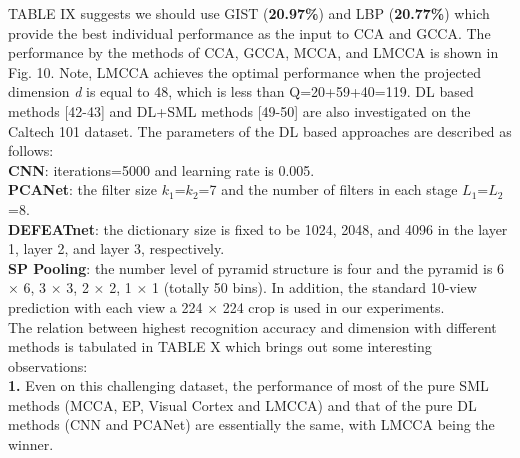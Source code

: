 \documentclass[journal]{IEEEtran}
\begin{document}
TABLE IX suggests we should use GIST (\textbf{20.97\%}) and LBP (\textbf{20.77\%}) which provide the best individual performance as the input to CCA and GCCA. %
The performance by the methods of CCA, GCCA, MCCA, and LMCCA is shown in Fig. 10. Note, LMCCA achieves the optimal performance when the projected dimension \emph{d} is equal to 48, which is less than Q=20+59+40=119. DL based methods [42-43] and DL+SML methods [49-50] are also investigated on the Caltech 101 dataset. The parameters of the DL based approaches are described as follows:\\
\textbf{CNN}: iterations=5000 and learning rate is 0.005.\\
\textbf{PCANet}: the filter size $k_1$=$k_2$=7 and the number of filters in each stage $L_1$=$L_2$=8.\\
\textbf{DEFEATnet}: the dictionary size is fixed to be 1024, 2048, and 4096 in the layer 1, layer 2, and layer 3, respectively.\\
\textbf{SP Pooling}: the number level of pyramid structure is four and the pyramid is {6 $\times$ 6, 3 $\times$ 3, 2 $\times$ 2, 1 $\times$ 1} (totally 50 bins). In addition, the standard 10-view prediction with each view a 224 $\times$ 224 crop is used in our experiments.\\\indent
The relation between highest recognition accuracy and dimension with different methods is tabulated in TABLE X which brings out some interesting observations:\\
\textbf{1.} Even on this challenging dataset, the performance of most of the pure SML methods (MCCA, EP, Visual Cortex and LMCCA) and that of the pure DL methods (CNN and PCANet) are essentially the same, with LMCCA being the winner.\\
\end{document}
